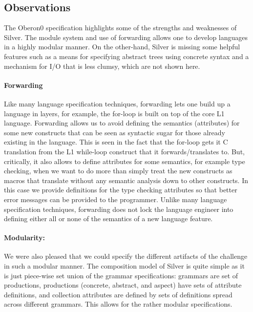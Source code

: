 \subsection{Observations}
\label{silver:sec:observations}

The Oberon0 specification highlights some of the strengths and
weaknesses of Silver.   The module system and use of forwarding allows
one to develop languages in a highly modular manner.   On the
other-hand, Silver is missing some helpful features such as a means for
specifying abstract trees using concrete syntax and a mechanism for
I/O that is less clumsy, which are not shown here.

\paragraph{Forwarding}
Like many language specification techniques, forwarding lets one build
up a language in layers, for example, the for-loop is built on top of
the core L1 language.  Forwarding allows us to avoid defining the
semantics (attributes) for some new constructs that can be seen as
syntactic sugar for those already existing in the language.  This is
seen in the fact that the for-loop gets it C translation from the L1
while-loop construct that it forwards/translates to.  But,
critically, it also allows to define attributes for some semantics,
for example type checking, when we want to do more than simply treat
the new constructs as macros that translate without any semantic
analysis down to other constructs.  In this case we provide
definitions for the type checking attributes so that better error
messages can be provided to the programmer.
%
Unlike many language specification techniques, forwarding does not
lock the language engineer into defining either all or none of the
semantics of a new language feature.


\paragraph{Modularity:}
We were also pleased that we could specify the different artifacts of
the challenge in such a modular manner.  The composition model of
Silver is quite simple as it is just piece-wise set union of the
grammar specifications: grammars are set of productions, productions
(concrete, abstract, and aspect) have sets of attribute definitions,
and collection attributes are defined by sets of definitions spread
across different grammars.  This allows for the rather modular
specifications. 


